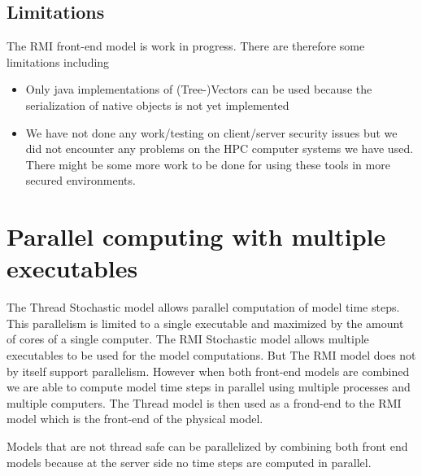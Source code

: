 \documentclass[12pt]{article}
\begin{document}
\subsection{Limitations}
The RMI front-end model is work in progress. There are therefore some limitations including
\begin{itemize}
\item Only java implementations of (Tree-)Vectors can be used because the serialization of native
          objects is not yet implemented
\item We have not done any work/testing on client/server security issues but we did not encounter any problems on the HPC computer systems we have used. There might be some more work to be done for using these tools in more secured environments.
\end{itemize}

\section{Parallel computing with multiple executables}
The Thread Stochastic model allows parallel computation of model time steps. This parallelism is limited to a single executable and maximized by the amount of cores of a single computer. The RMI Stochastic model allows multiple executables to be used for the model computations. But The RMI model does not by itself support parallelism.  However when both front-end models are combined we are able to compute model time steps in parallel using multiple processes and multiple computers. The Thread model is then used as a frond-end to the RMI model which is the front-end of the physical model.

Models that are not thread safe can be parallelized by combining both front end models because at the server side no time steps are computed in parallel.
\end{document}
